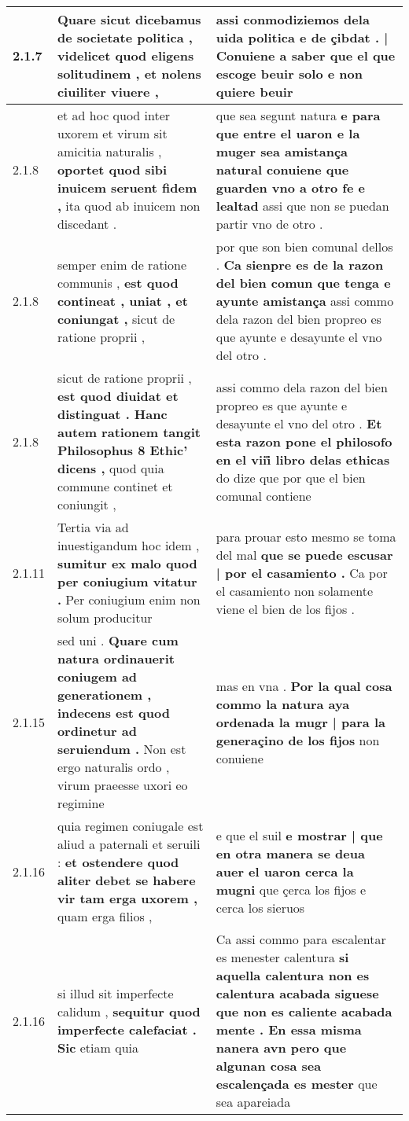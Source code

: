 \begin{tabular}{|p{1cm}|p{6.5cm}|p{6.5cm}|}
2.1.7 & Quare sicut dicebamus de societate politica , \textbf{ videlicet quod eligens solitudinem , } et nolens ciuiliter viuere , & assi conmodiziemos dela uida politica \textbf{ e de çibdat . | Conuiene a saber que el que escoge beuir solo } e non quiere beuir \\\hline
2.1.8 & et ad hoc quod inter uxorem et virum sit amicitia naturalis , \textbf{ oportet quod sibi inuicem seruent fidem , } ita quod ab inuicem non discedant . & que sea segunt natura \textbf{ e para que entre el uaron e la muger sea amistança natural conuiene que guarden vno a otro fe e lealtad } assi que non se puedan partir vno de otro . \\\hline
2.1.8 & semper enim de ratione communis , \textbf{ est quod contineat , uniat , et coniungat , } sicut de ratione proprii , & por que son bien comunal dellos . \textbf{ Ca sienpre es de la razon del bien comun que tenga e ayunte amistança } assi commo dela razon del bien propreo es que ayunte e desayunte el vno del otro . \\\hline
2.1.8 & sicut de ratione proprii , \textbf{ est quod diuidat et distinguat . Hanc autem rationem tangit Philosophus 8 Ethic’ dicens , } quod quia commune continet et coniungit , & assi commo dela razon del bien propreo es que ayunte e desayunte el vno del otro . \textbf{ Et esta razon pone el philosofo en el viii̊ libro delas ethicas } do dize que por que el bien comunal contiene \\\hline
2.1.11 & Tertia via ad inuestigandum hoc idem , \textbf{ sumitur ex malo quod per coniugium vitatur . } Per coniugium enim non solum producitur & para prouar esto mesmo se toma del mal \textbf{ que se puede escusar | por el casamiento . } Ca por el casamiento non solamente viene el bien de los fijos . \\\hline
2.1.15 & sed uni . \textbf{ Quare cum natura ordinauerit coniugem ad generationem , indecens est quod ordinetur ad seruiendum . } Non est ergo naturalis ordo , virum praeesse uxori eo regimine & mas en vna . \textbf{ Por la qual cosa commo la natura aya ordenada la mugr | para la generaçino de los fijos } non conuiene \\\hline
2.1.16 & quia regimen coniugale est aliud a paternali et seruili : \textbf{ et ostendere quod aliter debet se habere vir tam erga uxorem , } quam erga filios , & e que el suil \textbf{ e mostrar | que en otra manera se deua auer el uaron cerca la mugni } que çerca los fijos e cerca los sieruos \\\hline
2.1.16 & si illud sit imperfecte calidum , \textbf{ sequitur quod imperfecte calefaciat . Sic } etiam quia & Ca assi commo para escalentar es menester calentura \textbf{ si aquella calentura non es calentura acabada siguese que non es caliente acabada mente . En essa misma nanera avn pero que algunan cosa sea escalençada es mester } que sea apareiada \\\hline

\end{tabular}
